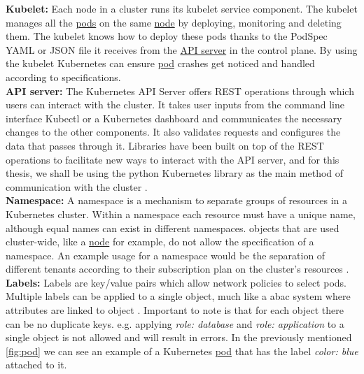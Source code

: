 \textbf{Kubelet:} \label{comp:kubelet} Each node in a cluster runs its kubelet service component. The kubelet manages all the \hyperref[comp:pod]{pods} on the same \hyperref[comp:node]{node} by deploying, monitoring and deleting them. The kubelet knows how to deploy these pods thanks to the PodSpec YAML or JSON file it receives from the \hyperref[comp:apiserver]{API server} in the control plane. By using the kubelet Kubernetes can ensure \hyperref[comp:pod]{pod} crashes get noticed and handled according to specifications. \cite{kubelet}
\\[10pt]

\textbf{API server:} \label{comp:apiserver} The Kubernetes API Server offers REST operations through which users can interact with the cluster. It takes user inputs from the command line interface Kubectl or a Kubernetes dashboard and communicates the necessary changes to the other components. It also validates requests and configures the data that passes through it. Libraries have been built on top of the REST operations to facilitate new ways to interact with the API server, and for this thesis, we shall be using the python Kubernetes library as the main method of communication with the cluster \cite{pythonk8s} \cite{kubeapiserver}.
\\[10pt]


\textbf{Namespace:} \label{comp:namespace} A namespace is a mechanism to separate groups of resources in a Kubernetes cluster. Within a namespace each resource must have a unique name, although equal names can exist in different namespaces. objects that are used cluster-wide, like a \hyperref[comp:node]{node} for example, do not allow the specification of a namespace. An example usage for a namespace would be the separation of different tenants according to their subscription plan on the cluster's resources \cite{namespace} \cite{feasability}.
\\[10pt]


\textbf{Labels:} \label{comp:label} Labels are key/value pairs which allow network policies to select pods. Multiple labels can be applied to a single object, much like a \acrfull{abac} system where attributes are linked to object \cite{abac}. Important to note is that for each object there can be no duplicate keys. e.g. applying \textit{role: database} and \textit{role: application} to a single object is not allowed and will result in errors. In the previously mentioned \autoref{fig:pod} we can see an example of a Kubernetes \hyperref[comp:pod]{pod} that has the label \textit{color: blue} attached to it. 
\\[5pt]

